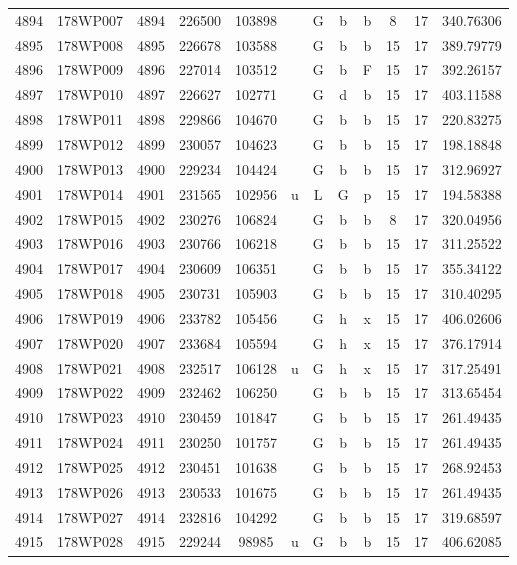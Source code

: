 \begin{tabular}{|*{12}{c|}}
4894 & 178WP007 & 4894 & 226500 & 103898 &  & G & b & b & 8 & 17 & 340.76306 \\ 
4895 & 178WP008 & 4895 & 226678 & 103588 &  & G & b & b & 15 & 17 & 389.79779 \\ 
4896 & 178WP009 & 4896 & 227014 & 103512 &  & G & b & F & 15 & 17 & 392.26157 \\ 
4897 & 178WP010 & 4897 & 226627 & 102771 &  & G & d & b & 15 & 17 & 403.11588 \\ 
4898 & 178WP011 & 4898 & 229866 & 104670 &  & G & b & b & 15 & 17 & 220.83275 \\ 
4899 & 178WP012 & 4899 & 230057 & 104623 &  & G & b & b & 15 & 17 & 198.18848 \\ 
4900 & 178WP013 & 4900 & 229234 & 104424 &  & G & b & b & 15 & 17 & 312.96927 \\ 
4901 & 178WP014 & 4901 & 231565 & 102956 & u & L & G & p & 15 & 17 & 194.58388 \\ 
4902 & 178WP015 & 4902 & 230276 & 106824 &  & G & b & b & 8 & 17 & 320.04956 \\ 
4903 & 178WP016 & 4903 & 230766 & 106218 &  & G & b & b & 15 & 17 & 311.25522 \\ 
4904 & 178WP017 & 4904 & 230609 & 106351 &  & G & b & b & 15 & 17 & 355.34122 \\ 
4905 & 178WP018 & 4905 & 230731 & 105903 &  & G & b & b & 15 & 17 & 310.40295 \\ 
4906 & 178WP019 & 4906 & 233782 & 105456 &  & G & h & x & 15 & 17 & 406.02606 \\ 
4907 & 178WP020 & 4907 & 233684 & 105594 &  & G & h & x & 15 & 17 & 376.17914 \\ 
4908 & 178WP021 & 4908 & 232517 & 106128 & u & G & h & x & 15 & 17 & 317.25491 \\ 
4909 & 178WP022 & 4909 & 232462 & 106250 &  & G & b & b & 15 & 17 & 313.65454 \\ 
4910 & 178WP023 & 4910 & 230459 & 101847 &  & G & b & b & 15 & 17 & 261.49435 \\ 
4911 & 178WP024 & 4911 & 230250 & 101757 &  & G & b & b & 15 & 17 & 261.49435 \\ 
4912 & 178WP025 & 4912 & 230451 & 101638 &  & G & b & b & 15 & 17 & 268.92453 \\ 
4913 & 178WP026 & 4913 & 230533 & 101675 &  & G & b & b & 15 & 17 & 261.49435 \\ 
4914 & 178WP027 & 4914 & 232816 & 104292 &  & G & b & b & 15 & 17 & 319.68597 \\ 
4915 & 178WP028 & 4915 & 229244 & 98985 & u & G & b & b & 15 & 17 & 406.62085 \\ 

\end{tabular}

